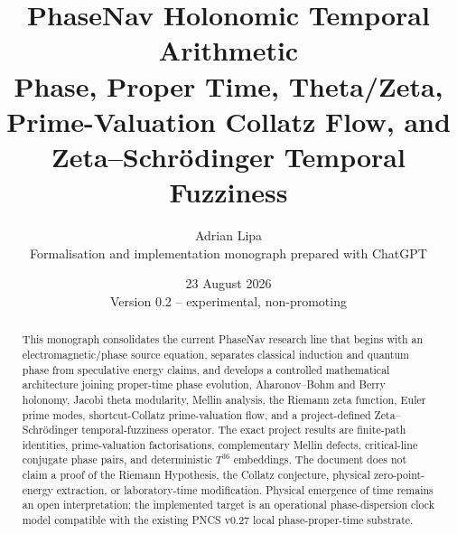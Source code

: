 \documentclass[11pt,a4paper]{article}
\title{\textbf{PhaseNav Holonomic Temporal Arithmetic}\\[0.5em]
\large Phase, Proper Time, Theta/Zeta, Prime-Valuation Collatz Flow, and Zeta--Schrödinger Temporal Fuzziness}
\author{Adrian Lipa\\\small Formalisation and implementation monograph prepared with ChatGPT}
\date{23 August 2026\\\small Version 0.2 -- experimental, non-promoting}
\newcommand{\Tthirtysix}{T^{36}}
\begin{document}
\maketitle
\begin{abstract}
This monograph consolidates the current PhaseNav research line that begins with an electromagnetic/phase source equation, separates classical induction and quantum phase from speculative energy claims, and develops a controlled mathematical architecture joining proper-time phase evolution, Aharonov--Bohm and Berry holonomy, Jacobi theta modularity, Mellin analysis, the Riemann zeta function, Euler prime modes, shortcut-Collatz prime-valuation flow, and a project-defined Zeta--Schrödinger temporal-fuzziness operator. The exact project results are finite-path identities, prime-valuation factorisations, complementary Mellin defects, critical-line conjugate phase pairs, and deterministic \(\Tthirtysix\) embeddings. The document does not claim a proof of the Riemann Hypothesis, the Collatz conjecture, physical zero-point-energy extraction, or laboratory-time modification. Physical emergence of time remains an open interpretation; the implemented target is an operational phase-dispersion clock model compatible with the existing PNCS v0.27 local phase-proper-time substrate.
\end{abstract}
\tableofcontents
\clearpage







\appendix


\end{document}
